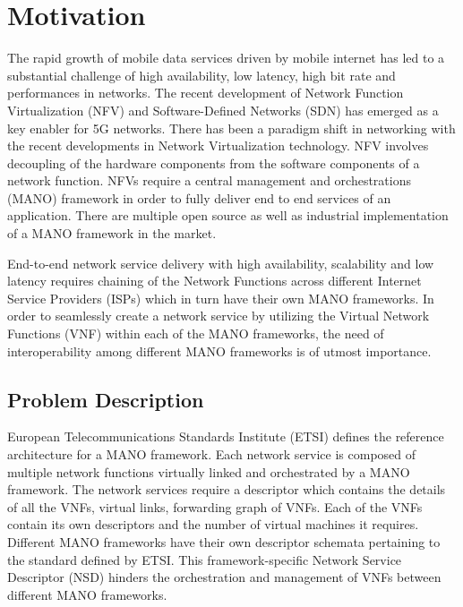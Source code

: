 \chapter{Motivation}
\label{ch:Motivation}


The rapid growth of mobile data services driven by mobile internet has led to a substantial challenge of high availability, low latency, high bit rate and performances in networks. The recent development of Network Function Virtualization (NFV) and Software-Defined Networks (SDN) has emerged as a key enabler for 5G networks. 
There has been a paradigm shift in networking with the recent developments in Network Virtualization technology. NFV involves decoupling of the hardware components from the software components of a network function. NFVs require a central management and orchestrations (MANO) framework  in order to fully deliver end to end services of an application. There are multiple open source as well as industrial implementation of a  MANO framework in the market. 

End-to-end network service delivery with high availability, scalability and low latency requires chaining of the Network Functions across different Internet Service Providers (ISPs) which in turn have their own MANO frameworks. In order to seamlessly create a network service by utilizing the Virtual Network Functions (VNF) within each of the MANO frameworks, the need of interoperability among different MANO frameworks is of utmost importance.


\section{Problem Description}

European Telecommunications Standards Institute (ETSI) defines the reference architecture for a MANO framework. Each network service is composed of multiple network functions virtually linked and orchestrated by a MANO framework. The network services require a descriptor which contains the details of all the VNFs, virtual links, forwarding graph of VNFs. Each of the VNFs contain its own descriptors and the number of virtual machines it requires. Different MANO frameworks have their own descriptor schemata pertaining to the standard defined by ETSI. This framework-specific Network Service Descriptor (NSD) hinders the orchestration and management of VNFs between different MANO frameworks. 

